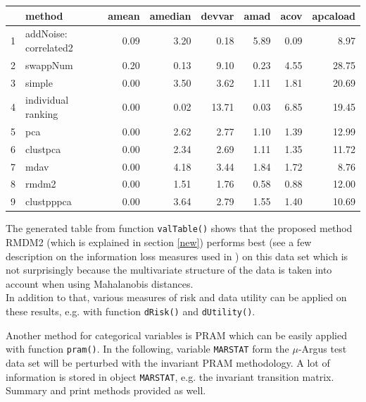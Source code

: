 \documentclass[12pt]{article}
\begin{document}
\begin{center}
\begin{tabular}{rlrrrrrr}
  \hline
 & method & amean & amedian & devvar & amad & acov & apcaload \\
  \hline
  1 & addNoise: correlated2 & 0.09 & 3.20 & 0.18 & 5.89 & 0.09 & 8.97 \\
  2 & swappNum & 0.20 & 0.13 & 9.10 & 0.23 & 4.55 & 28.75 \\
  3 & simple & 0.00 & 3.50 & 3.62 & 1.11 & 1.81 & 20.69 \\
  4 & individual ranking & 0.00 & 0.02 & 13.71 & 0.03 & 6.85 & 19.45 \\
  5 & pca & 0.00 & 2.62 & 2.77 & 1.10 & 1.39 & 12.99 \\
  6 & clustpca & 0.00 & 2.34 & 2.69 & 1.11 & 1.35 & 11.72 \\
  7 & mdav & 0.00 & 4.18 & 3.44 & 1.84 & 1.72 & 8.76 \\
  8 & rmdm2 & 0.00 & 1.51 & 1.76 & 0.58 & 0.88 & 12.00 \\
  9 & clustpppca & 0.00 & 3.64 & 2.79 & 1.55 & 1.40 & 10.69 \\
   \hline
\end{tabular}
\end{center}

The generated table from function {\tt valTable()} shows that the proposed method RMDM2 (which is explained in section \ref{new}) performs best (see a few description on the information loss measures used in \cite{Templ06}) on this data set which is not surprisingly because the multivariate structure of the data is taken into account when using Mahalanobis distances.\\

In addition to that, various measures of risk and data utility can be applied on these results, e.g. with function {\tt dRisk()} and {\tt dUtility()}.

Another method for categorical variables is PRAM which can be easily applied with function {\tt pram()}. In the following, variable {\tt MARSTAT} form the $\mu$-Argus test data set will be perturbed with the invariant PRAM methodology. A lot of information is stored in object {\tt MARSTAT}, e.g. the invariant transition matrix. Summary and print methods provided as well.  
\end{document}
